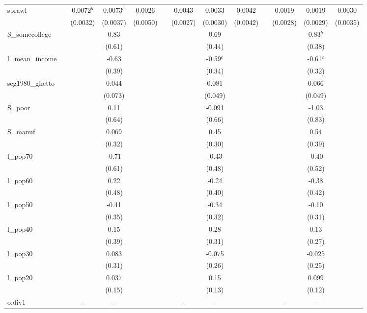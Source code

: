 \documentclass[]{article}
\begin{document}
\begin{tabular}{lcccccccccccc}
sprawl &  & 0.0072$^b$ & 0.0073$^b$ & 0.0026 &  & 0.0043 & 0.0033 & 0.0042 &  & 0.0019 & 0.0019 & 0.0030 \\
 &  & (0.0032) & (0.0037) & (0.0050) &  & (0.0027) & (0.0030) & (0.0042) &  & (0.0028) & (0.0029) & (0.0035) \\
S\_somecollege &  &  & 0.83 &  &  &  & 0.69 &  &  &  & 0.83$^b$ &  \\
 &  &  & (0.61) &  &  &  & (0.44) &  &  &  & (0.38) &  \\
l\_mean\_income &  &  & -0.63 &  &  &  & -0.59$^c$ &  &  &  & -0.61$^c$ &  \\
 &  &  & (0.39) &  &  &  & (0.34) &  &  &  & (0.32) &  \\
seg1980\_ghetto &  &  & 0.044 &  &  &  & 0.081 &  &  &  & 0.066 &  \\
 &  &  & (0.073) &  &  &  & (0.049) &  &  &  & (0.049) &  \\
S\_poor &  &  & 0.11 &  &  &  & -0.091 &  &  &  & -1.03 &  \\
 &  &  & (0.64) &  &  &  & (0.66) &  &  &  & (0.83) &  \\
S\_manuf &  &  & 0.069 &  &  &  & 0.45 &  &  &  & 0.54 &  \\
 &  &  & (0.32) &  &  &  & (0.30) &  &  &  & (0.39) &  \\
l\_pop70 &  &  & -0.71 &  &  &  & -0.43 &  &  &  & -0.40 &  \\
 &  &  & (0.61) &  &  &  & (0.48) &  &  &  & (0.52) &  \\
l\_pop60 &  &  & 0.22 &  &  &  & -0.24 &  &  &  & -0.38 &  \\
 &  &  & (0.48) &  &  &  & (0.40) &  &  &  & (0.42) &  \\
l\_pop50 &  &  & -0.41 &  &  &  & -0.34 &  &  &  & -0.10 &  \\
 &  &  & (0.35) &  &  &  & (0.32) &  &  &  & (0.31) &  \\
l\_pop40 &  &  & 0.15 &  &  &  & 0.28 &  &  &  & 0.13 &  \\
 &  &  & (0.39) &  &  &  & (0.31) &  &  &  & (0.27) &  \\
l\_pop30 &  &  & 0.083 &  &  &  & -0.075 &  &  &  & -0.025 &  \\
 &  &  & (0.31) &  &  &  & (0.26) &  &  &  & (0.25) &  \\
l\_pop20 &  &  & 0.037 &  &  &  & 0.15 &  &  &  & 0.099 &  \\
 &  &  & (0.15) &  &  &  & (0.13) &  &  &  & (0.12) &  \\
o.div1 &  & - & - &  &  & - & - &  &  & - & - &  \\

\end{tabular}
\end{document}
